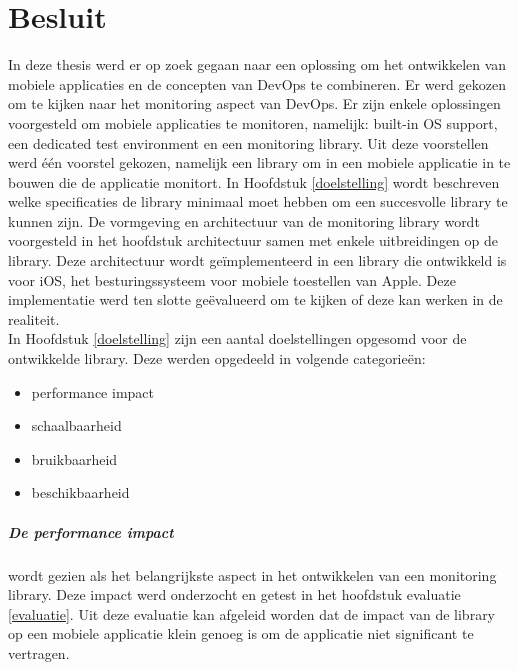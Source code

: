\chapter{Besluit}
\label{besluit}


In deze thesis werd er op zoek gegaan naar een oplossing om het ontwikkelen van mobiele applicaties en de concepten van DevOps te combineren. Er werd gekozen om te kijken naar het monitoring aspect van DevOps. Er zijn enkele oplossingen voorgesteld om mobiele applicaties te monitoren, namelijk: built-in OS support, een dedicated test environment en een monitoring library. Uit deze voorstellen werd \'e\'en voorstel gekozen, namelijk een library om in een mobiele applicatie in te bouwen die de applicatie monitort. In Hoofdstuk \ref{doelstelling} wordt beschreven welke specificaties de library minimaal moet hebben om een succesvolle library te kunnen zijn. De vormgeving en architectuur van de monitoring library wordt voorgesteld in het hoofdstuk architectuur samen met enkele uitbreidingen op de library. Deze architectuur wordt ge\"implementeerd in een library die ontwikkeld is voor iOS, het besturingssysteem voor mobiele toestellen van Apple. Deze implementatie werd ten slotte ge\"evalueerd om te kijken of deze kan werken in de realiteit. \\


In Hoofdstuk \ref{doelstelling} zijn een aantal doelstellingen opgesomd voor de ontwikkelde library. Deze werden opgedeeld in volgende categorie\"en: 
\begin{itemize}
\item performance impact
\item schaalbaarheid
\item bruikbaarheid
\item beschikbaarheid
\end{itemize}

\paragraph{De performance impact} wordt gezien als het belangrijkste aspect in het ontwikkelen van een monitoring library. Deze impact werd onderzocht en getest in het hoofdstuk evaluatie \ref{evaluatie}. Uit deze evaluatie kan afgeleid worden dat de impact van de library op een mobiele applicatie klein genoeg is om de applicatie niet significant te vertragen. \\


